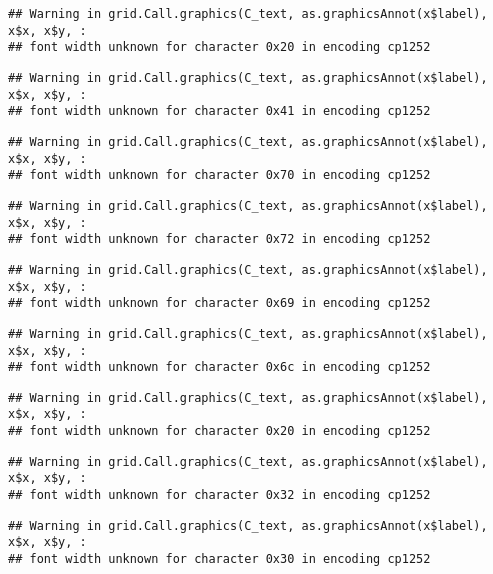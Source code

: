 \documentclass[
]{article}
\begin{document}
\begin{verbatim}
## Warning in grid.Call.graphics(C_text, as.graphicsAnnot(x$label), x$x, x$y, :
## font width unknown for character 0x20 in encoding cp1252
\end{verbatim}

\begin{verbatim}
## Warning in grid.Call.graphics(C_text, as.graphicsAnnot(x$label), x$x, x$y, :
## font width unknown for character 0x41 in encoding cp1252
\end{verbatim}

\begin{verbatim}
## Warning in grid.Call.graphics(C_text, as.graphicsAnnot(x$label), x$x, x$y, :
## font width unknown for character 0x70 in encoding cp1252
\end{verbatim}

\begin{verbatim}
## Warning in grid.Call.graphics(C_text, as.graphicsAnnot(x$label), x$x, x$y, :
## font width unknown for character 0x72 in encoding cp1252
\end{verbatim}

\begin{verbatim}
## Warning in grid.Call.graphics(C_text, as.graphicsAnnot(x$label), x$x, x$y, :
## font width unknown for character 0x69 in encoding cp1252
\end{verbatim}

\begin{verbatim}
## Warning in grid.Call.graphics(C_text, as.graphicsAnnot(x$label), x$x, x$y, :
## font width unknown for character 0x6c in encoding cp1252
\end{verbatim}

\begin{verbatim}
## Warning in grid.Call.graphics(C_text, as.graphicsAnnot(x$label), x$x, x$y, :
## font width unknown for character 0x20 in encoding cp1252
\end{verbatim}

\begin{verbatim}
## Warning in grid.Call.graphics(C_text, as.graphicsAnnot(x$label), x$x, x$y, :
## font width unknown for character 0x32 in encoding cp1252
\end{verbatim}

\begin{verbatim}
## Warning in grid.Call.graphics(C_text, as.graphicsAnnot(x$label), x$x, x$y, :
## font width unknown for character 0x30 in encoding cp1252
\end{verbatim}
\end{document}
